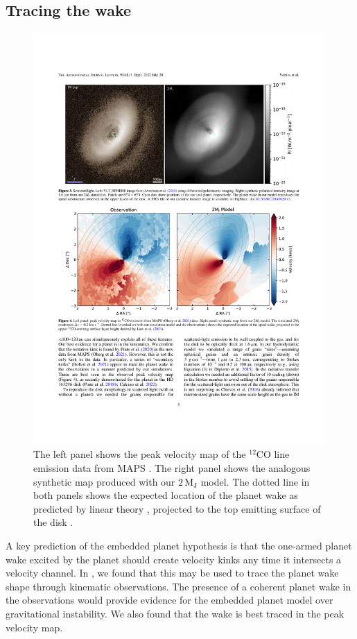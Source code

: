 \subsection{Tracing the wake}

\begin{figure}
    \centering
    \includegraphics[width = 0.99\textwidth]{figures/verrios_v0.pdf}
    \caption{The left panel shows the peak velocity map of the $^{12}$CO line emission data from MAPS \citep{oberg2021}. The right panel shows the analogous synthetic map produced with our $2 \, \mathrm{M_J}$ model. The dotted line in both panels shows the expected location of the planet wake as predicted by linear theory \citep{ogilvie2002}, projected to the top emitting surface of the disk \citep{pinte2018,law2021}.}
    \label{fig:verrios_v0}
\end{figure}

A key prediction of the embedded planet hypothesis is that the one-armed planet wake excited by the planet should create velocity kinks any time it intersects a velocity channel.
In \citet{calcino2022}, we found that this may be used to trace the planet wake shape through kinematic observations.
The presence of a coherent planet wake in the observations would provide evidence for the embedded planet model over gravitational instability.
We also found that the wake is best traced in the peak velocity map.

